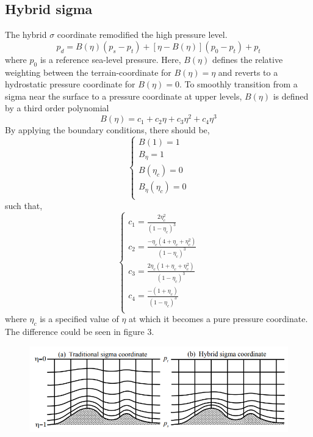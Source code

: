 \documentclass{article}
\begin{document}
\begin{sloppypar}
\subsection{Hybrid sigma}
The hybrid $\sigma$ coordinate remodified the high pressure level.
\begin{equation}
    p_d=B(\eta)(p_s-p_t)+[\eta-B(\eta)](p_0-p_t)+p_t
\end{equation}
where $p_0$ is a reference sea-level pressure. Here, $B(\eta)$ defines the relative weighting between the terrain-coordinate for $B(\eta)=\eta$ and
reverts to a hydrostatic pressure coordinate for $B(\eta)=0$. To smoothly transition from a sigma near the surface to a pressure coordinate at upper levels,
$B(\eta)$ is defined by a third order polynomial \newline
\begin{equation}
    B(\eta)=c_1+c_2\eta+c_3\eta^{2}+c_4\eta^{3}
\end{equation}
By applying the boundary conditions, there should be,
\begin{equation}
    \begin{cases}
        B(1)=1             \\
        B_{\eta}=1         \\
        B(\eta_c)=0        \\
        B_{\eta}(\eta_c)=0 \\
    \end{cases}
\end{equation}
such that,
\begin{equation}
    \begin{cases}
        c_1=\frac{2\eta_c^2}{(1-\eta_c)^3}                  \\
        c_2=\frac{-\eta_c(4+\eta_c+\eta_c^2)}{(1-\eta_c)^3} \\
        c_3=\frac{2\eta_c(1+\eta_c+\eta_c^2)}{(1-\eta_c)^3} \\
        c_4=\frac{-(1+\eta_c)}{(1-\eta_c)^3}                \\
    \end{cases}
\end{equation}
where $\eta_c$ is a specified value of $\eta$ at which it becomes a pure pressure coordinate.
The difference could be seen in figure 3.
\begin{figure}
    \centering
    \includegraphics[scale=0.45]{../imgs/wiki/hybridsigma.png}

\end{figure}
\end{sloppypar}
\end{document}
